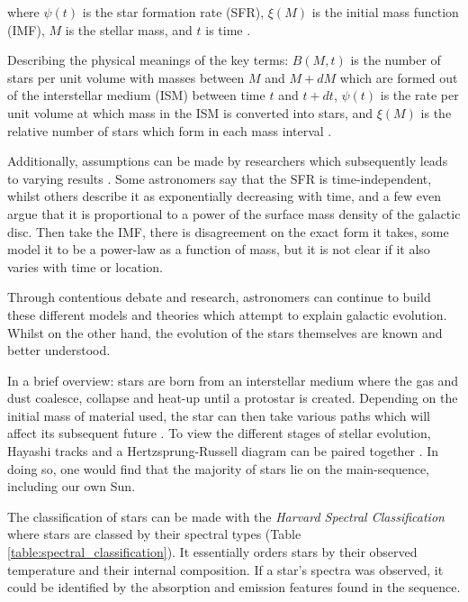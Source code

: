 \documentclass[12pt, twocolumn]{revtex4-1}    %
\begin{document}
where $\psi(t)$ is the star formation rate (SFR), $\xi (M)$ is the initial mass function (IMF), $M$ is the stellar mass, and $t$ is time \citep{carroll_astro}. 

Describing the physical meanings of the key terms: $B(M,t)$ is the number of stars per unit volume with masses between $M$ and $M+dM$ which are formed out of the interstellar medium (ISM) between time $t$ and $t+dt$, $\psi(t)$ is the rate per unit volume at which mass in the ISM is converted into stars, and $\xi(M)$ is the relative number of stars which form in each mass interval \citep{carroll_astro}. 

Additionally, assumptions can be made by researchers which subsequently leads to varying results \citep{carroll_astro}. Some astronomers say that the SFR is time-independent, whilst others describe it as exponentially decreasing with time, and a few even argue that it is proportional to a power of the surface mass density of the galactic disc. Then take the IMF, there is disagreement on the exact form it takes, some model it to be a power-law as a function of mass, but it is not clear if it also varies with time or location.

Through contentious debate and research, astronomers can continue to build these different models and theories which attempt to explain galactic evolution. Whilst on the other hand, the evolution of the stars themselves are known and better understood. 

In a brief overview: stars are born from an interstellar medium where the gas and dust coalesce, collapse and heat-up until a protostar is created. Depending on the initial mass of material used, the star can then take various paths which will affect its subsequent future \citep{mccoy_space_sciences}. To view the different stages of stellar evolution, Hayashi tracks and a Hertzsprung-Russell diagram can be paired together \citep{carroll_astro}. In doing so, one would find that the majority of stars lie on the main-sequence, including our own Sun.  


The classification of stars can be made with the \textit{Harvard Spectral Classification} where stars are classed by their spectral types (Table \ref{table:spectral_classification}). It essentially orders stars by their observed temperature and their internal composition. If a star's spectra was observed, it could be identified by the absorption and emission features found in the sequence.   
\end{document}
